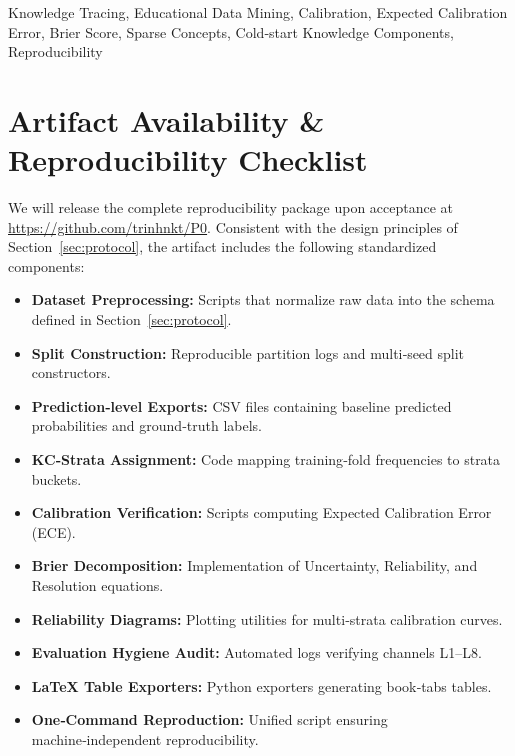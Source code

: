 \documentclass[conference]{IEEEtran}
\begin{document}
\begin{IEEEkeywords}
Knowledge Tracing, Educational Data Mining, Calibration, Expected Calibration Error, Brier Score, Sparse Concepts, Cold‑start Knowledge Components, Reproducibility
\end{IEEEkeywords}








\section*{Artifact Availability \& Reproducibility Checklist}
We will release the complete reproducibility package upon acceptance at \url{https://github.com/trinhnkt/P0}. Consistent with the design principles of Section~\ref{sec:protocol}, the artifact includes the following standardized components:
\begin{itemize}
  \item \textbf{Dataset Preprocessing:} Scripts that normalize raw data into the schema defined in Section~\ref{sec:protocol}.
  \item \textbf{Split Construction:} Reproducible partition logs and multi‑seed split constructors.
  \item \textbf{Prediction‑level Exports:} CSV files containing baseline predicted probabilities and ground‑truth labels.
  \item \textbf{KC‑Strata Assignment:} Code mapping training‑fold frequencies to strata buckets.
  \item \textbf{Calibration Verification:} Scripts computing Expected Calibration Error (ECE).
  \item \textbf{Brier Decomposition:} Implementation of Uncertainty, Reliability, and Resolution equations.
  \item \textbf{Reliability Diagrams:} Plotting utilities for multi‑strata calibration curves.
  \item \textbf{Evaluation Hygiene Audit:} Automated logs verifying channels L1--L8.
  \item \textbf{LaTeX Table Exporters:} Python exporters generating book‑tabs tables.
  \item \textbf{One‑Command Reproduction:} Unified script ensuring machine‑independent reproducibility.
\end{itemize}

\appendices




\end{document}
